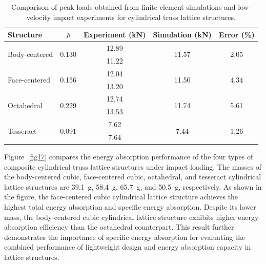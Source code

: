 \documentclass[12pt,a4paper]{article}
\begin{document}
\begin{table}[htbp]
	\centering
	\caption{Comparison of peak loads obtained from finite element simulations and low-velocity impact experiments for cylindrical truss lattice structures.}
	\label{tab4}
	\begin{tabular}{lcccc}
		\toprule
		Structure & $\bar{\rho}$ & Experiment (kN) & Simulation (kN) & Error (\%) \\
		\midrule
		\multirow{2}{*}{Body-centered}
		& \multirow{2}{*}{0.130} & 12.89 & \multirow{2}{*}{11.57} & \multirow{2}{*}{2.05} \\
		&                        & 11.22 &                        &                       \\
		\midrule
		\multirow{2}{*}{Face-centered}
		& \multirow{2}{*}{0.156} & 12.04 & \multirow{2}{*}{11.50} & \multirow{2}{*}{4.34} \\
		&                        & 13.20 &                        &                       \\
		\midrule
		\multirow{2}{*}{Octahedral}
		& \multirow{2}{*}{0.229} & 12.74 & \multirow{2}{*}{11.74} & \multirow{2}{*}{5.61} \\
		&                        & 13.53 &                        &                       \\
		\midrule
		\multirow{2}{*}{Tesseract}
		& \multirow{2}{*}{0.091} & 7.62  & \multirow{2}{*}{7.44}  & \multirow{2}{*}{1.26} \\
		&                        & 7.64  &                        &                       \\
		\bottomrule
	\end{tabular}
\end{table}
%

Figure~\ref{fig17} compares the energy absorption performance of the four types of composite cylindrical truss lattice structures under impact loading. The masses of the body-centered cubic, face-centered cubic, octahedral, and tesseract cylindrical lattice structures are \SI{39.1}{g}, \SI{58.4}{g}, \SI{65.7}{g}, and \SI{50.5}{g}, respectively. As shown in the figure, the face-centered cubic cylindrical lattice structure achieves the highest total energy absorption and specific energy absorption. Despite its lower mass, the body-centered cubic cylindrical lattice structure exhibits higher energy absorption efficiency than the octahedral counterpart. This result further demonstrates the importance of specific energy absorption for evaluating the combined performance of lightweight design and energy absorption capacity in lattice structures.
\end{document}
